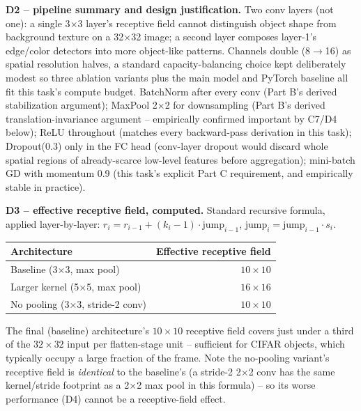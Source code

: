 \documentclass[11pt,a4paper]{article}
\begin{document}
\textbf{D2 -- pipeline summary and design justification.} Two conv layers (not one): a
single 3$\times$3 layer's receptive field cannot distinguish object shape from background
texture on a 32$\times$32 image; a second layer composes layer-1's edge/color detectors
into more object-like patterns. Channels double (8$\to$16) as spatial resolution halves, a
standard capacity-balancing choice kept deliberately modest so three ablation variants plus
the main model and PyTorch baseline all fit this task's compute budget. BatchNorm after
every conv (Part B's derived stabilization argument); MaxPool 2$\times$2 for downsampling
(Part B's derived translation-invariance argument -- empirically confirmed important by
C7/D4 below); ReLU throughout (matches every backward-pass derivation in this task);
Dropout(0.3) only in the FC head (conv-layer dropout would discard whole spatial regions of
already-scarce low-level features before aggregation); mini-batch GD with momentum 0.9 (this
task's explicit Part C requirement, and empirically stable in practice).

\textbf{D3 -- effective receptive field, computed.} Standard recursive formula, applied
layer-by-layer: $r_i = r_{i-1} + (k_i-1)\cdot\text{jump}_{i-1}$, $\text{jump}_i = \text{jump}_{i-1}\cdot s_i$.

\begin{table}[H]
\centering
\begin{tabular}{lr}
\toprule
\textbf{Architecture} & \textbf{Effective receptive field} \\
\midrule
Baseline (3$\times$3, max pool) & $10\times10$ \\
Larger kernel (5$\times$5, max pool) & $16\times16$ \\
No pooling (3$\times$3, stride-2 conv) & $10\times10$ \\
\bottomrule
\end{tabular}
\end{table}

The final (baseline) architecture's $10\times10$ receptive field covers just under a third
of the $32\times32$ input per flatten-stage unit -- sufficient for CIFAR objects, which
typically occupy a large fraction of the frame. Note the no-pooling variant's receptive
field is \emph{identical} to the baseline's (a stride-2 2$\times$2 conv has the same
kernel/stride footprint as a 2$\times$2 max pool in this formula) -- so its worse
performance (D4) cannot be a receptive-field effect.
\end{document}
